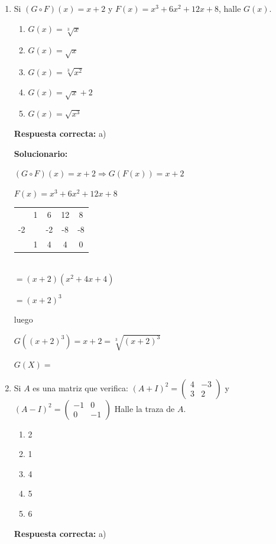 \begin{enumerate}[resume]

	\item Si $(G \circ F)(x) = x + 2$ y $F(x) = x^3 + 6x^2 + 12x + 8$, halle $G(x)$.
	\begin{enumerate}[label=\alph*)]
		\item $G(x) = \sqrt[3]{x}$
		\item $G(x) = \sqrt{x}$
		\item $G(x) = \sqrt[3]{x^2}$
		\item $G(x) = \sqrt{x} + 2$
		\item $G(x) = \sqrt{x^3}$
	\end{enumerate}
	\textbf{Respuesta correcta:} a)

	\vspace{2mm}
	\textbf{Solucionario:}

	$(G \circ F)(x) = x + 2 \Rightarrow G(F(x)) = x + 2$

	$F(x) = x^3 + 6x^2 + 12x + 8$

	\hfill
	\begin{tabular}{c|cccc}
		& 1 & 6 & 12 & 8 \\
		-2 & & -2 & -8 & -8 \\
		\hline
		& 1 & 4 & 4 & 0
	\end{tabular}\\
	$= (x + 2)(x^2 + 4x + 4)$

	$= (x + 2)^3$

	luego

	$G((x + 2)^3) = x + 2 = \sqrt[3]{(x + 2)^3}$

	$G(X) =$

	\vspace{6mm}

	\item Si $A$ es una matriz que verifica:
	$(A + I)^2 = \begin{pmatrix} 4 & -3 \\ 3 & 2 \end{pmatrix}$ y $(A - I)^2 = \begin{pmatrix} -1 & 0 \\ 0 & -1 \end{pmatrix}$
	Halle la traza de $A$.
	\begin{enumerate}[label=\alph*)]
		\item 2
		\item 1
		\item 4
		\item 5
		\item 6
	\end{enumerate}
	\textbf{Respuesta correcta:} a)


\end{enumerate}

